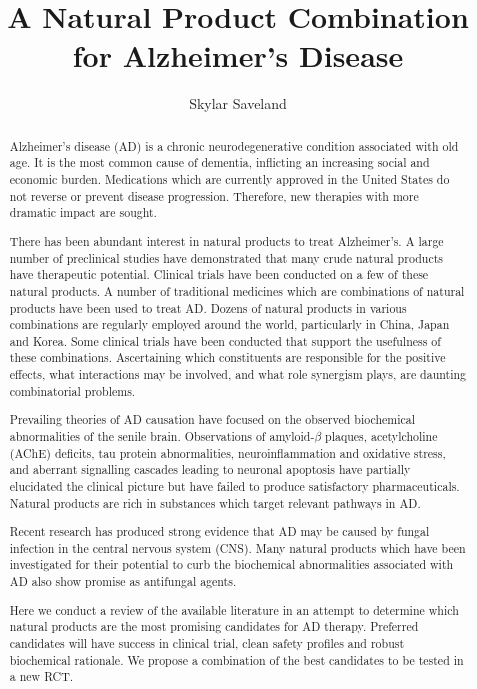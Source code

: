 \documentclass[twocolumn]{article}
\begin{document}
\onecolumn
\title{A Natural Product Combination for Alzheimer's Disease}
\author{Skylar Saveland}

\maketitle

\begin{abstract}


Alzheimer's disease (AD) is a chronic neurodegenerative condition
associated with old age. It is the most common cause of dementia,
inflicting an increasing social and economic burden.
Medications which are currently approved in the United States
do not reverse or prevent disease progression.
Therefore, new therapies with more dramatic impact are sought.

There has been abundant interest in natural products to treat Alzheimer's.
A large number of preclinical studies have demonstrated
that many crude natural products have therapeutic potential.
Clinical trials have been conducted on a few of these natural products.
A number of traditional medicines which are combinations of natural products
have been used to treat AD.
Dozens of natural products in various combinations are regularly employed
around the world, particularly in China, Japan and Korea.
Some clinical trials
have been conducted that support the usefulness of these combinations.
Ascertaining which constituents are responsible for the positive effects,
what interactions may be involved,
and what role synergism plays, are daunting combinatorial problems.

Prevailing theories of AD causation have focused on the observed
biochemical abnormalities of the senile brain.
Observations of amyloid-$\beta$ plaques, acetylcholine (AChE) deficits,
tau protein abnormalities,
neuroinflammation and oxidative stress,
and aberrant signalling cascades leading to neuronal apoptosis
have partially elucidated the clinical picture
but have failed to produce satisfactory pharmaceuticals.
Natural products are rich in substances which target
relevant pathways in AD.

Recent research has produced strong evidence
that AD may be caused by fungal infection in the central nervous system (CNS).
Many natural products which have been investigated for their potential
to curb the biochemical abnormalities associated with AD
also show promise as antifungal agents.

Here we conduct a review of the available literature in an attempt
to determine which natural products are the most promising
candidates for AD therapy.
Preferred candidates will have
success in clinical trial,
clean safety profiles
and robust biochemical rationale.
We propose a combination of the best candidates to be tested in a new RCT.
\end{abstract}
\tableofcontents
\twocolumn
\end{document}
